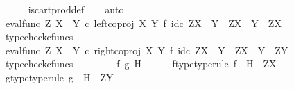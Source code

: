 \begin{isabellebody}
\ \ \ \ \isamarkupfalse%
\ is{\isacharunderscore}{\kern0pt}cart{\isacharunderscore}{\kern0pt}prod{\isacharunderscore}{\kern0pt}def\isanewline
\ \ \isamarkupfalse%
\ auto\isanewline
\ \ \ \ \isamarkupfalse%
\ {\isachardoublequoteopen}{\isacharparenleft}{\kern0pt}eval{\isacharunderscore}{\kern0pt}func\ Z\ {\isacharparenleft}{\kern0pt}X\ {\isasymCoprod}\ Y{\isacharparenright}{\kern0pt}\ {\isasymcirc}\isactrlsub c\ left{\isacharunderscore}{\kern0pt}coproj\ X\ Y\ {\isasymtimes}\isactrlsub f\ id\isactrlsub c\ {\isacharparenleft}{\kern0pt}Z\isactrlbsup {\isacharparenleft}{\kern0pt}X\ {\isasymCoprod}\ Y{\isacharparenright}{\kern0pt}\isactrlesup {\isacharparenright}{\kern0pt}{\isacharparenright}{\kern0pt}\isactrlsup {\isasymsharp}\ {\isacharcolon}{\kern0pt}\ Z\isactrlbsup {\isacharparenleft}{\kern0pt}X\ {\isasymCoprod}\ Y{\isacharparenright}{\kern0pt}\isactrlesup \ {\isasymrightarrow}\ Z\isactrlbsup X\isactrlesup {\isachardoublequoteclose}\isanewline
\ \ \ \ \ \ \isamarkupfalse%
\ typecheck{\isacharunderscore}{\kern0pt}cfuncs\isanewline
\ \ \ \ \isamarkupfalse%
\ {\isachardoublequoteopen}{\isacharparenleft}{\kern0pt}eval{\isacharunderscore}{\kern0pt}func\ Z\ {\isacharparenleft}{\kern0pt}X\ {\isasymCoprod}\ Y{\isacharparenright}{\kern0pt}\ {\isasymcirc}\isactrlsub c\ right{\isacharunderscore}{\kern0pt}coproj\ X\ Y\ {\isasymtimes}\isactrlsub f\ id\isactrlsub c\ {\isacharparenleft}{\kern0pt}Z\isactrlbsup {\isacharparenleft}{\kern0pt}X\ {\isasymCoprod}\ Y{\isacharparenright}{\kern0pt}\isactrlesup {\isacharparenright}{\kern0pt}{\isacharparenright}{\kern0pt}\isactrlsup {\isasymsharp}\ {\isacharcolon}{\kern0pt}\ Z\isactrlbsup {\isacharparenleft}{\kern0pt}X\ {\isasymCoprod}\ Y{\isacharparenright}{\kern0pt}\isactrlesup \ {\isasymrightarrow}\ Z\isactrlbsup Y\isactrlesup {\isachardoublequoteclose}\isanewline
\ \ \ \ \ \ \isamarkupfalse%
\ typecheck{\isacharunderscore}{\kern0pt}cfuncs\isanewline
\ \ \isamarkupfalse%
\isanewline
\ \ \ \ \isamarkupfalse%
\ f\ g\ H\isanewline
\ \ \ \ \isamarkupfalse%
\ f{\isacharunderscore}{\kern0pt}type{\isacharbrackleft}{\kern0pt}type{\isacharunderscore}{\kern0pt}rule{\isacharbrackright}{\kern0pt}{\isacharcolon}{\kern0pt}\ {\isachardoublequoteopen}f\ {\isacharcolon}{\kern0pt}\ H\ {\isasymrightarrow}\ Z\isactrlbsup X\isactrlesup {\isachardoublequoteclose}\isanewline
\ \ \ \ \isamarkupfalse%
\ g{\isacharunderscore}{\kern0pt}type{\isacharbrackleft}{\kern0pt}type{\isacharunderscore}{\kern0pt}rule{\isacharbrackright}{\kern0pt}{\isacharcolon}{\kern0pt}\ {\isachardoublequoteopen}g\ {\isacharcolon}{\kern0pt}\ H\ {\isasymrightarrow}\ Z\isactrlbsup Y\isactrlesup {\isachardoublequoteclose}\isanewline

\end{isabellebody}
